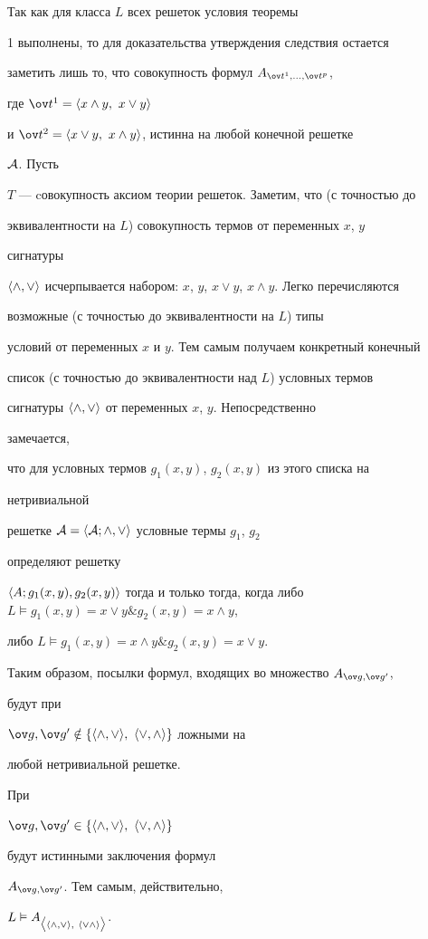 \begin{pf} 


Так как для класса $L$ всех решеток условия теоремы 


1 выполнены, то для доказательства утверждения следствия остается 


заметить лишь то, что совокупность формул $A_{\ov t^1,\dotsc,\ov t^p}$, 


где $\ov t^1=\la x\wedge y,\ x\vee y\ra$ 


и $\ov t^2=\la x\vee y,\ x\wedge y\ra$, истинна на любой конечной решетке 


$\cal A$. Пусть 


$T$ --- cовокупность аксиом теории решеток. Заметим, что (с точностью до 


эквивалентности на $L$) совокупность термов от переменных $x$, $y$ 


сигнатуры 


$\la\wedge,\vee\ra$ исчерпывается набором: $x$, $y$, $x\vee y$, $x\wedge 


y$. Легко перечисляются 


возможные (с точностью до эквивалентности на $L$) типы 


условий от переменных $x$ и $y$. Тем самым получаем конкретный конечный 


список (с точностью до эквивалентности над $L$) условных термов 


сигнатуры $\langle\wedge,\vee\rangle$ от переменных $x$, $y$. Непосредственно 


замечается, 


что для условных термов $g_1(x,y)$, $g_2(x,y)$ из этого списка на 


нетривиальной 


решетке $\cal A=\langle A;\wedge,\vee\rangle$ условные термы $g_1$, $g_2$ 


определяют решетку 


$\la A;g_1(x,y),g_2(x,y)\ra$ тогда и только тогда, когда либо $L\vDash 


g_1(x,y)=x\vee y\& g_2(x,y)=x\wedge y$, 


либо $L\vDash g_1(x,y)=x\wedge y\& g_2(x,y)=x\vee y$. 


Таким образом, посылки формул, входящих во множество $A_{\ov g,\ov g'}$, 


будут при 


$\ov g,\ov g'\notin\{\la\wedge,\vee\ra,\ \la\vee,\wedge\ra\}$ ложными на 


любой нетривиальной решетке. 


При 


$\ov g,\ov g'\in\{\la\wedge,\vee\ra,\ \la\vee,\wedge\ra\}$ 


будут истинными заключения формул 


$A_{\ov g, \ov g'}$. Тем самым, действительно, 


$L\vDash A_{\big\la\la\wedge,\vee\ra,\ \la\vee\wedge\ra\big\ra}$. 


\end{pf} 


